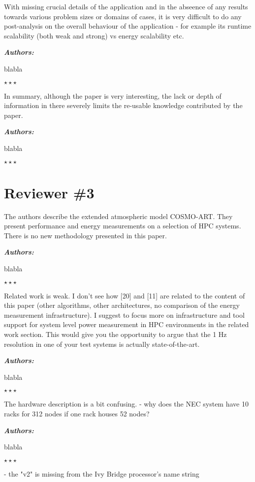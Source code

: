 \documentclass[a4paper,11pt]{article}
\newcounter{question}
\newcommand{\weReply}{\vspace{0.25cm} {\bf \noindent } \addtocounter{question}{1} \textbf{\emph{Authors:}} \medskip \em\par}
\newenvironment{weSay}{\bigskip \weReply \begin{it}}{\end{it}\begin{center} \samepage$\star \star \star$ \end{center}}
\begin{document}
With missing crucial details of the application and in the abseence of any results towards various 
problem sizes or domains of cases, it is very difficult to do any post-analysis on the overall 
behaviour of the application - for example its runtime scalability (both weak and strong) vs energy 
scalability etc.

\begin{weSay}
blabla
\end{weSay}

In summary, although the paper is very interesting, the lack or depth of information in there severely 
limits the re-usable knowledge contributed by the paper.

\begin{weSay}
blabla
\end{weSay}


\newpage
\section*{Reviewer \#3}

The authors describe the extended atmospheric model COSMO-ART. They present
performance and energy measurements on a selection of HPC systems. There
is no new methodology presented in this paper.

\begin{weSay}
blabla
\end{weSay}

Related work is weak. I don't see how [20] and [11] are related to the content
of this paper (other algorithms, other architectures, no comparison of the
energy measurement infrastructure). I suggest to focus more on infrastructure
and tool support for system level power measurement in HPC environments in
the related work section. This would give you the opportunity to argue that
the 1 Hz resolution in one of your test systems is actually state-of-the-art.

\begin{weSay}
blabla
\end{weSay}

The hardware description is a bit confusing.
- why does the NEC system have 10 racks for 312 nodes if one rack houses 52
     nodes?

\begin{weSay}
blabla
\end{weSay}

- the "v2" is missing from the Ivy Bridge processor's name string
\end{document}
